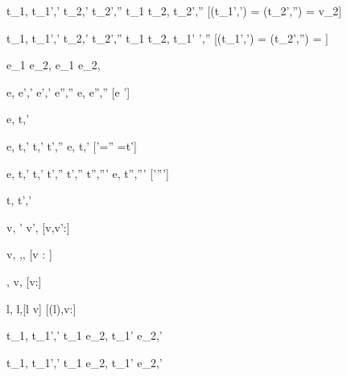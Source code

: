  {t_1,{\sigma}  {\stride} {t_1}',{\sigma}'  \Quad
   t_2,{\sigma}' {\stride} {t_2}',{\sigma}''}
  {t_1 \Or t_2,{\sigma} {\stride} {t_2}',{\sigma}''}
  [\Value({t_1}',{\sigma}') = \bot \land \Value({t_2}',{\sigma}'') = {v_2}]

  {t_1,{\sigma}  {\stride }{t_1}',{\sigma}'  \Quad
   t_2,{\sigma' }{\stride} {t_2}',{\sigma}''}
  {t_1 \Or t_2,{\sigma} {\stride} {t_1}' ',{\sigma}''}
  [\Value({t_1}',{\sigma}') = \bot \land \Value({t_2}',{\sigma}'') = \bot]


  { }
  {e_1 \Xor e_2,{\sigma} {\stride} e_1 \Xor e_2,{\sigma}}

    {e,{\sigma} {\eval} {e}',{\sigma}'  \Quad
     e',{\sigma}' {\stride} {e}'',{\sigma}''}
    {e,{\sigma} {\stride} {e}'',{\sigma}''}
    [e ']



  {e,{\sigma} {\normalise} {t},{\sigma}'}


    {e,{\sigma} {\eval} {t},{\sigma}' \Quad
     {t},{\sigma}' {\stride} {t}',{\sigma}''}
    {e,{\sigma} {\normalise} {t},{\sigma}'}
    [{\sigma}'={\sigma}'' ={t}']

    {e,{\sigma} {\eval} {t},{\sigma}'  \Quad
     {t},{\sigma}' {\stride} {t}',{\sigma}''  \Quad
     {t}',{\sigma}'' {\normalise} {t}'',{\sigma}'''}
    {e,{\sigma} {\normalise} {t}'',{\sigma}'''}
    [{\sigma}'\neq {\sigma}''']




  {t,{\sigma}  {t'},{\sigma}'}


  { }
  {\Edit v,{\sigma} ' \Edit v',{\sigma}}
  [v,v':\tau]

  { }
  {\Edit v,\sigma \handle{\Empty} \Enter \tau,\sigma,\True}
  [v : \tau]

  { }
  {\Enter \tau,{\sigma}  \Edit v,{\sigma}}
  [v:\tau]

  { }
  {\Update l,{\sigma}  \Update l,{\sigma}[l \mapsto v]}
  [\sigma(l),v:\tau]

  {t_1,\sigma {} {t_1'},\sigma'}
  {t_1 \Then e_2,\sigma {} {t_1'} \Then e_2,\sigma'}

  {t_1,\sigma {} {t_1'},\sigma'}
  {t_1 \Next e_2,\sigma {} {t_1'} \Next e_2,\sigma'}


